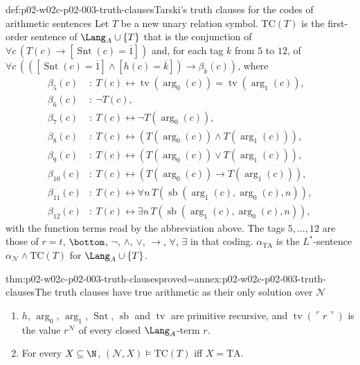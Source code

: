 \begin{hbdefinition}{def:p02-w02c-p02-003-truth-clauses}{Tarski's truth clauses for the codes of arithmetic sentences}
Let \(T\) be a new unary relation symbol.  \(\mathrm{TC}(T)\) is the
first-order sentence of \(\Lang_A\cup\{T\}\) that is the conjunction of
\(\forall c\,(T(c)\to[\operatorname{Snt}(c)=\overline1])\) and, for each
tag \(k\) from \(5\) to \(12\), of
\(\forall c\,(([\operatorname{Snt}(c)=\overline1]\land[h(c)=\overline k])\to\beta_k(c))\),
where
\begin{align*}
 \beta_5(c)&:\ T(c)\leftrightarrow
   \operatorname{tv}(\operatorname{arg}_0(c))=\operatorname{tv}(\operatorname{arg}_1(c)),\\
 \beta_6(c)&:\ \neg T(c),\\
 \beta_7(c)&:\ T(c)\leftrightarrow\neg T(\operatorname{arg}_0(c)),\\
 \beta_8(c)&:\ T(c)\leftrightarrow(T(\operatorname{arg}_0(c))\land T(\operatorname{arg}_1(c))),\\
 \beta_9(c)&:\ T(c)\leftrightarrow(T(\operatorname{arg}_0(c))\lor T(\operatorname{arg}_1(c))),\\
 \beta_{10}(c)&:\ T(c)\leftrightarrow(T(\operatorname{arg}_0(c))\to T(\operatorname{arg}_1(c))),\\
 \beta_{11}(c)&:\ T(c)\leftrightarrow\forall n\,T(\operatorname{sb}(\operatorname{arg}_1(c),\operatorname{arg}_0(c),n)),\\
 \beta_{12}(c)&:\ T(c)\leftrightarrow\exists n\,T(\operatorname{sb}(\operatorname{arg}_1(c),\operatorname{arg}_0(c),n)),
\end{align*}
with the function terms read by the abbreviation above.  The tags
\(5,\ldots,12\) are those of \(r=t\), \(\bottom\), \(\neg\), \(\land\),
\(\lor\), \(\to\), \(\forall\), \(\exists\) in that coding.
\(\alpha_{\mathrm{TA}}\) is the \(L^{*}\)-sentence
\(\alpha_{\mathcal N}\land\mathrm{TC}(T)\) for \(\Lang_A\cup\{T\}\).
\end{hbdefinition}

\begin{hblemma}{thm:p02-w02c-p02-003-truth-clauses}{proved=annex:p02-w02c-p02-003-truth-clauses}{The truth clauses have true arithmetic as their only solution over \(\mathcal N\)}
\begin{enumerate}
\item \(h\), \(\operatorname{arg}_0\), \(\operatorname{arg}_1\),
      \(\operatorname{Snt}\), \(\operatorname{sb}\) and \(\operatorname{tv}\)
      are primitive recursive, and \(\operatorname{tv}(\ulcorner r\urcorner)\)
      is the value \(r^{\mathcal N}\) of every closed \(\Lang_A\)-term \(r\).
\item For every \(X\subseteq\N\), \((\mathcal N,X)\models\mathrm{TC}(T)\)
      iff \(X=\mathrm{TA}\).
\end{enumerate}
\end{hblemma}

